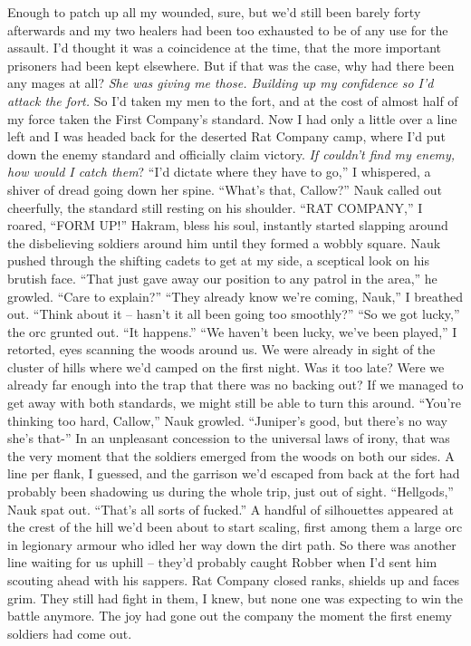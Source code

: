 \documentclass[12pt, openany]{book}
\begin{document}
Enough to patch up all my wounded, sure, but we’d still been barely forty afterwards and my two healers had been too exhausted to be of any use for the assault. I’d thought it was a coincidence at the time, that the more important prisoners had been kept elsewhere. But if that was the case, why had there been any mages at all? \textit{She was giving me those. Building up my confidence so I’d attack the fort. }So I’d taken my men to the fort, and at the cost of almost half of my force taken the First Company’s standard. Now I had only a little over a line left and I was headed back for the deserted Rat Company camp, where I’d put down the enemy standard and officially claim victory. \textit{If couldn’t find my enemy, how would I catch them}?
“I’d dictate where they have to go,” I whispered, a shiver of dread going down her spine.
“What’s that, Callow?” Nauk called out cheerfully, the standard still resting on his shoulder.
“RAT COMPANY,” I roared, “FORM UP!”
Hakram, bless his soul, instantly started slapping around the disbelieving soldiers around him until they formed a wobbly square. Nauk pushed through the shifting cadets to get at my side, a sceptical look on his brutish face.
“That just gave away our position to any patrol in the area,” he growled. “Care to explain?”
“They already know we’re coming, Nauk,” I breathed out. “Think about it – hasn’t it all been going too smoothly?”
“So we got lucky,” the orc grunted out. “It happens.”
“We haven’t been lucky, we’ve been played,” I retorted, eyes scanning the woods around us. We were already in sight of the cluster of hills where we’d camped on the first night. Was it too late? Were we already far enough into the trap that there was no backing out? If we managed to get away with both standards, we might still be able to turn this around.
“You’re thinking too hard, Callow,” Nauk growled. “Juniper’s good, but there’s no way she’s that-”
In an unpleasant concession to the universal laws of irony, that was the very moment that the soldiers emerged from the woods on both our sides. A line per flank, I guessed, and the garrison we’d escaped from back at the fort had probably been shadowing us during the whole trip, just out of sight.
“Hellgods,” Nauk spat out. “That’s all sorts of fucked.”
A handful of silhouettes appeared at the crest of the hill we’d been about to start scaling, first among them a large orc in legionary armour who idled her way down the dirt path. So there was another line waiting for us uphill – they’d probably caught Robber when I’d sent him scouting ahead with his sappers. Rat Company closed ranks, shields up and faces grim. They still had fight in them, I knew, but none one was expecting to win the battle anymore. The joy had gone out the company the moment the first enemy soldiers had come out.
\end{document}
